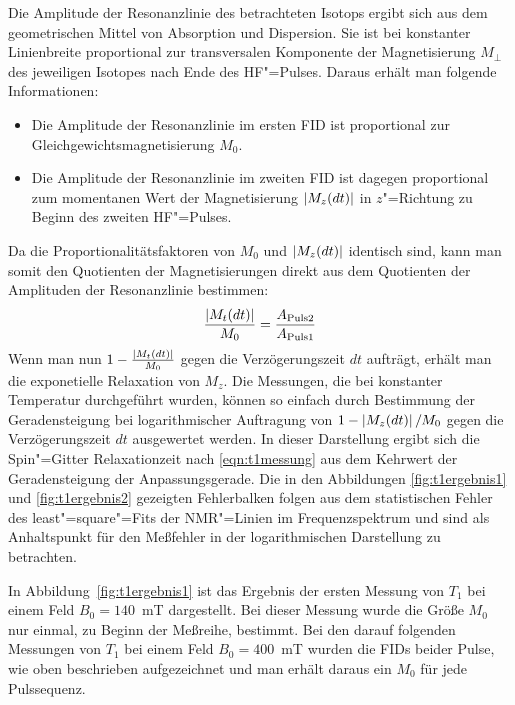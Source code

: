 Die Amplitude der Resonanzlinie des betrachteten Isotops ergibt sich aus dem geometrischen Mittel
von Absorption und Dispersion. Sie ist bei konstanter Linienbreite proportional zur transversalen
Komponente der Magnetisierung $M_\perp$ des jeweiligen Isotopes nach Ende des HF"=Pulses. Daraus
erhält man folgende Informationen:
 \begin{itemize}
	\item Die Amplitude der Resonanzlinie im ersten FID ist proportional zur
		Gleichgewichtsmagnetisierung $M_0$.
	\item Die Amplitude der Resonanzlinie im zweiten FID ist dagegen proportional zum momentanen
		Wert der Magnetisierung $\abs{M_z(dt)}$ in $z$"=Richtung zu Beginn des zweiten HF"=Pulses.
 \end{itemize}
Da die Proportionalitätsfaktoren von $M_0$ und $\abs{M_z(dt)}$ identisch sind, kann man somit den
Quotienten der Magnetisierungen direkt aus dem Quotienten der Amplituden der Resonanzlinie
bestimmen:
	\begin{equation}
		\frac{\abs{M_t(dt)}}{M_0}=\frac{A_\mathrm{Puls 2}}{A_\mathrm{Puls 1}}
	\end{equation}
Wenn man nun $1-\frac{\abs{M_t(dt)}}{M_0}$ gegen die Verzögerungszeit $dt$ aufträgt, erhält man die
exponetielle Relaxation von $M_z$. Die Messungen, die bei konstanter Temperatur durchgeführt wurden,
können so einfach durch Bestimmung der Geradensteigung bei logarithmischer Auftragung von
$1-\abs{M_z(dt)}/M_0$ gegen die Verzögerungszeit $dt$ ausgewertet werden. In dieser Darstellung
ergibt sich die Spin"=Gitter Relaxationzeit nach \eqref{eqn:t1messung} aus dem Kehrwert der
Geradensteigung der Anpassungsgerade. Die in den Abbildungen \ref{fig:t1ergebnis1} und
\ref{fig:t1ergebnis2} gezeigten Fehlerbalken folgen aus dem statistischen Fehler des
least"=square"=Fits der NMR"=Linien im Frequenzspektrum und sind als Anhaltspunkt für den Meßfehler
in der logarithmischen Darstellung zu betrachten.

In Abbildung~\ref{fig:t1ergebnis1} ist das Ergebnis der ersten Messung von $T_1$ bei einem Feld
$B_0=140$~mT dargestellt. Bei dieser Messung wurde die Größe $M_0$ nur einmal, zu Beginn der Meßreihe,
bestimmt. Bei den darauf folgenden Messungen von $T_1$ bei einem Feld $B_0=400$~mT wurden die FIDs
beider Pulse, wie oben beschrieben aufgezeichnet und man erhält daraus ein $M_0$ für jede
Pulssequenz.

